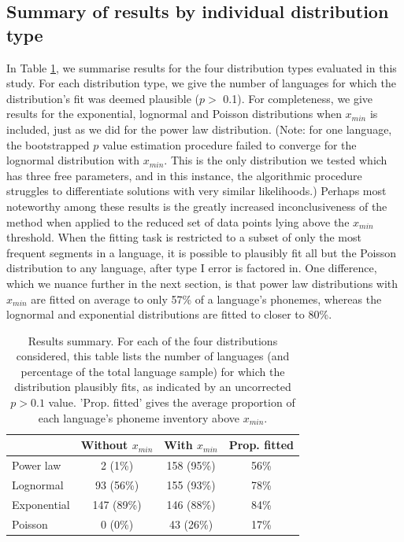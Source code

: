 \hypertarget{phon-freq-results-summary}{%
\subsection{Summary of results by individual distribution type}\label{phon-freq-results-summary}}

In Table \ref{tab:results-summary}, we summarise results for the four distribution types evaluated in this study. For each distribution type, we give the number of languages for which the distribution's fit was deemed plausible (\(p >\) 0.1). For completeness, we give results for the exponential, lognormal and Poisson distributions when \(x_{min}\) is included, just as we did for the power law distribution. (Note: for one language, the bootstrapped \(p\) value estimation procedure failed to converge for the lognormal distribution with \(x_{min}\). This is the only distribution we tested which has three free parameters, and in this instance, the algorithmic procedure struggles to differentiate solutions with very similar likelihoods.) Perhaps most noteworthy among these results is the greatly increased inconclusiveness of the method when applied to the reduced set of data points lying above the \(x_{min}\) threshold. When the fitting task is restricted to a subset of only the most frequent segments in a language, it is possible to plausibly fit all but the Poisson distribution to any language, after type I error is factored in. One difference, which we nuance further in the next section, is that power law distributions with \(x_{min}\) are fitted on average to only 57\% of a language's phonemes, whereas the lognormal and exponential distributions are fitted to closer to 80\%.

\begin{table}

\caption[Results summary]{\label{tab:results-summary}Results summary. For each of the four distributions considered, this table lists the number of languages (and percentage of the total language sample) for which the distribution plausibly fits, as indicated by an uncorrected $p > 0.1$ value. 'Prop. fitted' gives the average proportion of each language's phoneme inventory above $x_{min}$.}
\centering
\begin{tabular}[t]{lccc}
\toprule
\textbf{ } & \textbf{Without $x_{min}$} & \textbf{With $x_{min}$} & \textbf{Prop. fitted}\\
\midrule
Power law & 2 (1\%) & 158 (95\%) & 56\%\\
Lognormal & 93 (56\%) & 155 (93\%) & 78\%\\
Exponential & 147 (89\%) & 146 (88\%) & 84\%\\
Poisson & 0 (0\%) & 43 (26\%) & 17\%\\
\bottomrule
\end{tabular}
\end{table}

